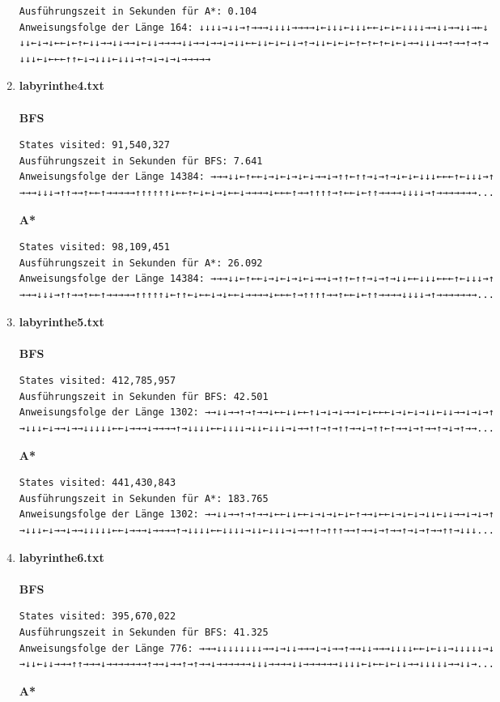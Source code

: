 \documentclass[a4paper,10pt,ngerman]{scrartcl}
\begin{document}
\begin{enumerate}
\begin{verbatim}
Ausführungszeit in Sekunden für A*: 0.104
Anweisungsfolge der Länge 164: ↓↓↓↓→↓↓→↑→→→↓↓↓↓→→→→↓←↓↓↓←↓↓↓←←↓←↓←↓↓↓↓→→↓↓→→↓↓→←↓
↓↓←↓→↓←←↓←↑←↓↓→→↓↓→→↓←↓↓→→→→↓↓→→↓→→↓→↓↓←←↓↓←↓←↓↓→↑→↓↓←↓←↓←↑←↑←↑←↓←↓→→↓↓↓→→↑→→↑→↑→
↓↓↓←↓←←←↑↑←↓→↓↓↓←↓↓↓→↑→↓→↓→↓→→→→→
\end{verbatim}
  \item \textbf{labyrinthe4.txt}\\
\\\textbf{BFS}
\begin{verbatim}
States visited: 91,540,327
Ausführungszeit in Sekunden für BFS: 7.641
Anweisungsfolge der Länge 14384: →→→↓↓←↑←←↓→↓←↓→↓←↓→→↓→↑↑←↑↑→↓→↑→↓←↓←↓↓↓←←←↑←↓↓↓→↑
→→→↓↓↓→↑↑→→↑←←↑→→→→→↑↑↑↑↑↑↓←←↑←↓←↓→↓←←↓→→→→↓←←←↑→→↑↑↑↑→↑←←↓←↑↑→→→→↓↓↓↓→↑→→→→→→→...
\end{verbatim}
\textbf{A*}
\begin{verbatim}
States visited: 98,109,451
Ausführungszeit in Sekunden für A*: 26.092
Anweisungsfolge der Länge 14384: →→→↓↓←↑←←↓→↓←↓→↓←↓→→↓→↑↑←↑↑→↓→↑→↓↓←←↓↓↓←←←↑←↓↓↓→↑
→→→↓↓↓→↑↑→→↑←←↑→→→→→↑↑↑↑↑↓←↑↑←↓←←↓→↓←←↓→→→→↓←←←↑→↑↑↑↑→→↑←←↓←↑↑→→→→↓↓↓↓→↑→→→→→→→...
\end{verbatim}
  \item \textbf{labyrinthe5.txt}\\
\\\textbf{BFS}
\begin{verbatim}
States visited: 412,785,957
Ausführungszeit in Sekunden für BFS: 42.501
Anweisungsfolge der Länge 1302: →→↓↓→→↑→↑→→↓←←↓↓←←↑↓→↓→↓→→↓←↓←←←↓→↓←↓→↓↓←↓↓→→↓→↓→↑
→↓↓↓←↓→→↓→→↓↓↓↓↓←←↓→→→↓→→→→↑→↓↓↓↓←←↓↓↓↓→↓↓←↓↓↓→↓→→↑↑→↑→↑↑→→↓→↑↑←↑→→↓→↑→→↑→↓→↑→→...
\end{verbatim}
\textbf{A*}
\begin{verbatim}
States visited: 441,430,843
Ausführungszeit in Sekunden für A*: 183.765
Anweisungsfolge der Länge 1302: →→↓↓→→↑→↑→→↓←←↓↓←←↓→↓→↓←↓←↑→→↓←←↓→↓←↓→↓↓←↓↓→→↓→↓→↑
→↓↓↓←↓→→↓→→↓↓↓↓↓←←↓→→→↓→→→→↑→↓↓↓↓←←↓↓↓↓→↓↓←↓↓↓→↓→→↑↑→↑↑↑→→↑→→↓→↑→→↑→↓→↑→→↑↑→↓↓↓...
\end{verbatim}
  \item \textbf{labyrinthe6.txt}\\
\\\textbf{BFS}
\begin{verbatim}
States visited: 395,670,022
Ausführungszeit in Sekunden für BFS: 41.325
Anweisungsfolge der Länge 776: →→→↓↓↓↓↓↓↓↓→→↓→↓↓→→→↓→↓→→↑→→↓↓→→→↓↓↓↓←←↓←↓↓→↓↓↓↓↓→↓
→↓↓←↓↓→→→↑↑→→→↓→→→→→→→↑→→↓→→↑→↑→→↓→→→→→→↓↓↓→→→→↓↓→→→→→→↓↓↓↓←↓←←↓←↓↓→→↓↓↓↓↓→→↓↓→...
\end{verbatim}
\textbf{A*}
\begin{verbatim}

\end{verbatim}
\end{enumerate}
\end{document}
